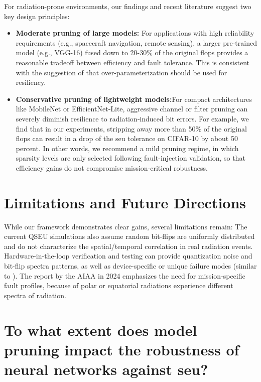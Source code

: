 For radiation-prone environments, our findings and recent literature suggest two key design principles:

\begin{itemize}
  \item \textbf{Moderate pruning of large models: } For applications with high reliability requirements (e.g., spacecraft navigation, remote sensing), a larger pre-trained model (e.g., VGG-16) fused down to 20-30\% of the original \gls{flops} provides a reasonable tradeoff between efficiency and fault tolerance. This is consistent with the suggestion of \cite{Catalan2025} that over-parameterization should be used for resiliency.
  
  \item \textbf{Conservative pruning of lightweight models:}For compact architectures like MobileNet or EfficientNet‑Lite, aggressive channel or filter pruning can severely diminish resilience to radiation‑induced bit errors. For example, we find that in our experiments, stripping away more than 50\% of the original \gls{flops} can result in a drop of the \gls{seu} tolerance on CIFAR‑10 by about 50 percent. In other words, we recommend a mild pruning regime, in which sparsity levels are only selected following fault-injection validation, so that efficiency gains do not compromise mission-critical robustness.

\end{itemize}

\section{Limitations and Future Directions}

While our framework demonstrates clear gains, several limitations remain:
The current QSEU simulations also assume random bit-flips are uniformly distributed and do not characterize the spatial/temporal correlation in real radiation events. Hardware-in-the-loop verification and testing can provide quantization noise and bit-flip spectra patterns, as well as device-specific or unique failure modes (similar to \cite{Goldstein2020}). The report by the AIAA in 2024 emphasizes the need for mission-specific fault profiles, because of polar or equatorial radiations experience different spectra of radiation.


\section{To what extent does model pruning impact the robustness of neural networks against \gls{seu}?}

